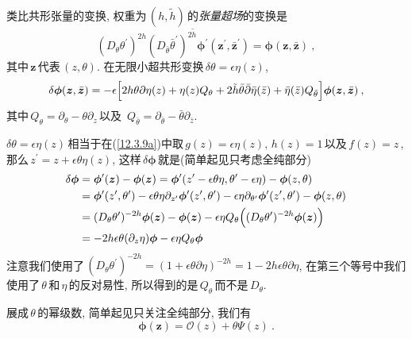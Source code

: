 类比共形张量的变换, 权重为$\,(h,\tilde{h})\,$的{\emph{张量超场}}的变换是
\begin{equation}
    (D_{\theta}\theta^{\prime})^{2h}(D_{\bar{\theta}}\bar{\theta}^{\prime})^{2\tilde{h}}
    \bm{\phi}^{\prime}(\bm{z}^{\prime},\bar{\bm{z}}^{\prime}) = \bm{\phi}(\bm{z},\bar{\bm{z}}) \:, \label{12.3.11}
\end{equation}
其中$\,\bm{z}\,$代表$\,(z,\theta)$. 在无限小超共形变换$\,\delta \theta=\epsilon\eta(z)$,
\begin{equation}
    \delta\bm{\phi}(\bm{z},\bar{\bm{z}})=-\epsilon
    \Bigl[2h\theta\partial\eta(z)+\eta(z)Q_{\theta}+2\tilde{h}\bar{\theta}\bar{\partial}\bar{\eta}(\bar{z})
    +\bar{\eta}(\bar{z})Q_{\bar{\theta}}\Bigr]\bm{\phi}(\bm{z},\bar{\bm{z}}) \:, \label{12.3.12}
\end{equation}
其中\,$Q_{\theta}=\partial_{\theta}-\theta\partial_{z}\,$以及%
$\,Q_{\bar{\theta}}=\partial_{\bar{\theta}}-\bar{\theta}\partial_{\bar{z}}$.
\begin{tcolorbox}
$\delta\theta = \epsilon\eta(z)\,$相当于在(\ref{12.3.9a})中取$\,g(z)=\epsilon\eta(z),\,h(z)=1\,$以及$\,f(z)=z\,$, 那么$\,z^{\prime}=z+\epsilon\theta\eta(z)$, 这样$\,\delta \bm{\phi}\,$就是(简单起见只考虑全纯部分)
\begin{align*}
    \delta\bm{\phi}&= \bm{\phi}^{\prime}(\bm{z})-\bm{\phi}(\bm{z}) = \bm{\phi}^{\prime}(z^{\prime}-\epsilon\theta\eta,\theta^{\prime}-\epsilon\eta)-\bm{\phi}(z,\theta) \\
    &=\bm{\phi}^{\prime}(z^{\prime},\theta^{\prime})
    -\epsilon\theta\eta\partial_{z^{\prime}}\bm{\phi}^{\prime}(z^{\prime},\theta^{\prime})
    -\epsilon\eta\partial_{\theta^{\prime}}\bm{\phi}^{\prime}(z^{\prime},\theta^{\prime}) -\bm{\phi}(z,\theta)\\
    &=(D_{\theta}\theta^{\prime})^{-2h}\bm{\phi}(\bm{z})-\bm{\phi}(\bm{z})
    -\epsilon\eta Q_{\theta}\Bigl((D_{\theta}\theta^{\prime})^{-2h}\bm{\phi}(\bm{z})\Bigr) \\
    &= -2h\epsilon\theta(\partial_{z}\eta) \bm{\phi} -\epsilon\eta Q_{\theta}\bm{\phi}
\end{align*}
注意我们使用了$\,(D_{\theta}\theta^{\prime})^{-2h}=(1+\epsilon\theta\partial\eta)^{-2h}=1-2h\epsilon\theta\partial\eta$, 在第三个等号中我们使用了$\,\theta\,$和$\,\eta\,$的反对易性, 所以得到的是$\,Q_{\theta}\,$而不是$\,D_{\theta}$.
\end{tcolorbox}
展成$\,\theta\,$的幂级数, 简单起见只关注全纯部分, 我们有
\begin{equation}
    \bm{\phi}(\bm{z}) = \mathcal{O}(z)+\theta \varPsi(z) \:. \label{12.3.13}
\end{equation}
